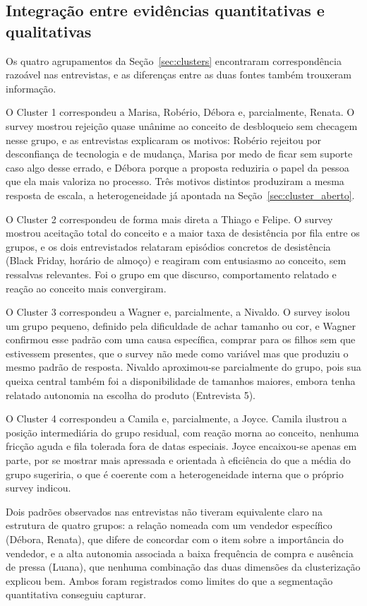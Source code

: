 \subsection{Integração entre evidências quantitativas e qualitativas}
\label{sec:integracao}

Os quatro agrupamentos da Seção~\ref{sec:clusters} encontraram correspondência razoável nas entrevistas, e as diferenças entre as duas fontes também trouxeram informação.

O Cluster 1 correspondeu a Marisa, Robério, Débora e, parcialmente, Renata. O survey mostrou rejeição quase unânime ao conceito de desbloqueio sem checagem nesse grupo, e as entrevistas explicaram os motivos: Robério rejeitou por desconfiança de tecnologia e de mudança, Marisa por medo de ficar sem suporte caso algo desse errado, e Débora porque a proposta reduziria o papel da pessoa que ela mais valoriza no processo. Três motivos distintos produziram a mesma resposta de escala, a heterogeneidade já apontada na Seção~\ref{sec:cluster_aberto}.

O Cluster 2 correspondeu de forma mais direta a Thiago e Felipe. O survey mostrou aceitação total do conceito e a maior taxa de desistência por fila entre os grupos, e os dois entrevistados relataram episódios concretos de desistência (Black Friday, horário de almoço) e reagiram com entusiasmo ao conceito, sem ressalvas relevantes. Foi o grupo em que discurso, comportamento relatado e reação ao conceito mais convergiram.

O Cluster 3 correspondeu a Wagner e, parcialmente, a Nivaldo. O survey isolou um grupo pequeno, definido pela dificuldade de achar tamanho ou cor, e Wagner confirmou esse padrão com uma causa específica, comprar para os filhos sem que estivessem presentes, que o survey não mede como variável mas que produziu o mesmo padrão de resposta. Nivaldo aproximou-se parcialmente do grupo, pois sua queixa central também foi a disponibilidade de tamanhos maiores, embora tenha relatado autonomia na escolha do produto (Entrevista 5).

O Cluster 4 correspondeu a Camila e, parcialmente, a Joyce. Camila ilustrou a posição intermediária do grupo residual, com reação morna ao conceito, nenhuma fricção aguda e fila tolerada fora de datas especiais. Joyce encaixou-se apenas em parte, por se mostrar mais apressada e orientada à eficiência do que a média do grupo sugeriria, o que é coerente com a heterogeneidade interna que o próprio survey indicou.

Dois padrões observados nas entrevistas não tiveram equivalente claro na estrutura de quatro grupos: a relação nomeada com um vendedor específico (Débora, Renata), que difere de concordar com o item sobre a importância do vendedor, e a alta autonomia associada a baixa frequência de compra e ausência de pressa (Luana), que nenhuma combinação das duas dimensões da clusterização explicou bem. Ambos foram registrados como limites do que a segmentação quantitativa conseguiu capturar.

